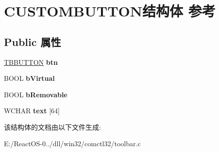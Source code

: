 \hypertarget{struct_c_u_s_t_o_m_b_u_t_t_o_n}{}\section{C\+U\+S\+T\+O\+M\+B\+U\+T\+T\+O\+N结构体 参考}
\label{struct_c_u_s_t_o_m_b_u_t_t_o_n}
\subsection*{Public 属性}
\begin{DoxyCompactItemize}
\item 
\mbox{\label{struct_c_u_s_t_o_m_b_u_t_t_o_n_a61ed338c7fee48725472c40f63d1f9cb}} 
\hyperlink{struct___t_b_b_u_t_t_o_n}{T\+B\+B\+U\+T\+T\+ON} {\bfseries btn}
\item 
\mbox{\label{struct_c_u_s_t_o_m_b_u_t_t_o_n_a8d3b07eb10f93fdd3535d1153464a289}} 
B\+O\+OL {\bfseries b\+Virtual}
\item 
\mbox{\label{struct_c_u_s_t_o_m_b_u_t_t_o_n_a71edde16b17df2a09ee40e3053195384}} 
B\+O\+OL {\bfseries b\+Removable}
\item 
\mbox{\label{struct_c_u_s_t_o_m_b_u_t_t_o_n_a5ea89e743a0b58139216462f1a95eb42}} 
W\+C\+H\+AR {\bfseries text} \mbox{[}64\mbox{]}
\end{DoxyCompactItemize}


该结构体的文档由以下文件生成\+:\begin{DoxyCompactItemize}
\item 
E\+:/\+React\+O\+S-\/0../dll/win32/comctl32/toolbar.\+c\end{DoxyCompactItemize}
